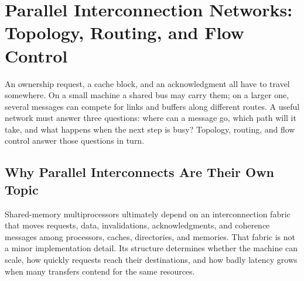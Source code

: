 \chapter[Parallel Interconnection Networks]{Parallel Interconnection Networks: Topology, Routing, and Flow Control}\label{ch:parallel-interconnects}

An ownership request, a cache block, and an acknowledgment all have to travel somewhere.
On a small machine a shared bus may carry them; on a larger one, several messages can compete for links and buffers along different routes.
A useful network must answer three questions: where can a message go, which path will it take, and what happens when the next step is busy?
Topology, routing, and flow control answer those questions in turn.


\section{Why Parallel Interconnects Are Their Own Topic}\label{sec:pin-why}
Shared-memory multiprocessors ultimately depend on an interconnection fabric that moves requests, data, invalidations, acknowledgments, and coherence messages among processors, caches, directories, and memories.
That fabric is not a minor implementation detail.
Its structure determines whether the machine can scale, how quickly requests reach their destinations, and how badly latency grows when many transfers contend for the same resources.

